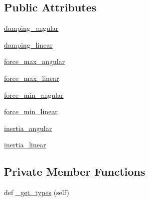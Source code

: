 \subsection*{Public Attributes}
\begin{DoxyCompactItemize}
\item 
\hyperlink{classjaco__msgs_1_1srv_1_1__SetForceControlParams_1_1SetForceControlParamsRequest_aac62c737f326721243120ed57493f460}{damping\+\_\+angular}
\item 
\hyperlink{classjaco__msgs_1_1srv_1_1__SetForceControlParams_1_1SetForceControlParamsRequest_a9ab3c9bb200986f210612fa05012ab2f}{damping\+\_\+linear}
\item 
\hyperlink{classjaco__msgs_1_1srv_1_1__SetForceControlParams_1_1SetForceControlParamsRequest_a1e80687d03a465ee0a3b22923e11d7d1}{force\+\_\+max\+\_\+angular}
\item 
\hyperlink{classjaco__msgs_1_1srv_1_1__SetForceControlParams_1_1SetForceControlParamsRequest_aae9888fc8efdf00c292dfaf866c90f7f}{force\+\_\+max\+\_\+linear}
\item 
\hyperlink{classjaco__msgs_1_1srv_1_1__SetForceControlParams_1_1SetForceControlParamsRequest_a059ff47ab34fd7730218c1a609bbb956}{force\+\_\+min\+\_\+angular}
\item 
\hyperlink{classjaco__msgs_1_1srv_1_1__SetForceControlParams_1_1SetForceControlParamsRequest_a8cfd79fa02dd2f62d84811d5f04693b1}{force\+\_\+min\+\_\+linear}
\item 
\hyperlink{classjaco__msgs_1_1srv_1_1__SetForceControlParams_1_1SetForceControlParamsRequest_a4ffea018c8ffc3cf44cdd7d68c4ca918}{inertia\+\_\+angular}
\item 
\hyperlink{classjaco__msgs_1_1srv_1_1__SetForceControlParams_1_1SetForceControlParamsRequest_ab5cf9f4019e6c446ca473ca2a38492ad}{inertia\+\_\+linear}
\end{DoxyCompactItemize}
\subsection*{Private Member Functions}
\begin{DoxyCompactItemize}
\item 
def \hyperlink{classjaco__msgs_1_1srv_1_1__SetForceControlParams_1_1SetForceControlParamsRequest_a45547323cc0e51d1f63229e3cdbbcea1}{\+\_\+get\+\_\+types} (self)
\end{DoxyCompactItemize}
